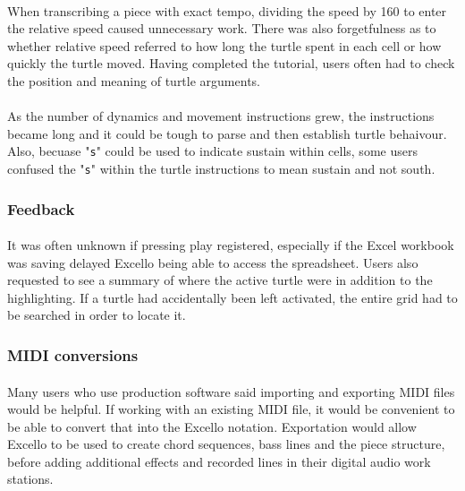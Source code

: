 \paragraph{} When transcribing a piece with exact tempo, dividing the speed by 160 to enter the relative speed caused unnecessary work. There was also forgetfulness as to whether relative speed referred to how long the turtle spent in each cell or how quickly the turtle moved. Having completed the tutorial, users often had to check the position and meaning of turtle arguments.

\paragraph{} As the number of dynamics and movement instructions grew, the instructions became long and it could be tough to parse and then establish turtle behaivour. Also, becuase "\texttt{s}" could be used to indicate sustain within cells, some users confused the "\texttt{s}" within the turtle instructions to mean sustain and not south.

\subsubsection{Feedback}

\paragraph{} It was often unknown if pressing play registered, especially if the Excel workbook was saving delayed Excello being able to access the spreadsheet. Users also requested to see a summary of where the active turtle were in addition to the highlighting. If a turtle had accidentally been left activated, the entire grid had to be searched in order to locate it.

\subsubsection{MIDI conversions}

\paragraph{} Many users who use production software said importing and exporting MIDI files would be helpful. If working with an existing MIDI file, it would be convenient to be able to convert that into the Excello notation. Exportation would allow Excello to be used to create chord sequences, bass lines and the piece structure, before adding additional effects and recorded lines in their digital audio work stations.

